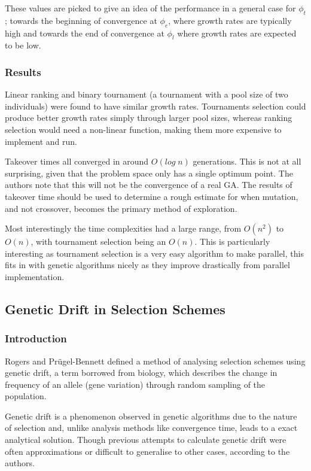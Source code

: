 \documentclass[10pt, a4paper]{article}
\begin{document}
These values are picked to give an idea of the performance in a general case for
$\phi_t$; towards the beginning of convergence at $\phi_e$, where growth rates
are typically high and towards the end of convergence at $\phi_l$ where growth
rates are expected to be low.

\subsubsection{Results} 
Linear ranking and binary tournament (a tournament with a pool size of two
individuals) were found to have similar growth rates. Tournaments selection
could produce better growth rates simply through larger pool sizes, whereas
ranking selection would need a non-linear function, making them more expensive
to implement and run.

Takeover times all converged in around $O(log\;n)$ generations. This is not at
all surprising, given that the problem space only has a single optimum point.
The authors note that this will not be the convergence of a real GA. The results
of takeover time should be used to determine a rough estimate for when mutation,
and not crossover, becomes the primary method of exploration.

Most interestingly the time complexities had a large range, from $O(n^2)$ to 
$O(n)$, with tournament selection being an $O(n)$. This is particularly 
interesting as tournament selection is a very easy algorithm to make parallel,
this fits in with genetic algorithms nicely as they improve drastically from 
parallel implementation.

\subsection{Genetic Drift in Selection Schemes}
\subsubsection{Introduction} 
Rogers and Pr\"{u}gel-Bennett\cite{Rogers1999Genetic} defined a method of 
analysing selection schemes using genetic drift, a term borrowed from biology,
which describes the change in frequency of an allele (gene variation) through
random sampling of the population.

Genetic drift is a phenomenon observed in genetic algorithms due to the nature
of selection and, unlike analysis methods like convergence time, leads to a
exact analytical solution. Though previous attempts to calculate genetic drift
were often approximations or difficult to generalise to other cases, according
to the authors.
\end{document}
